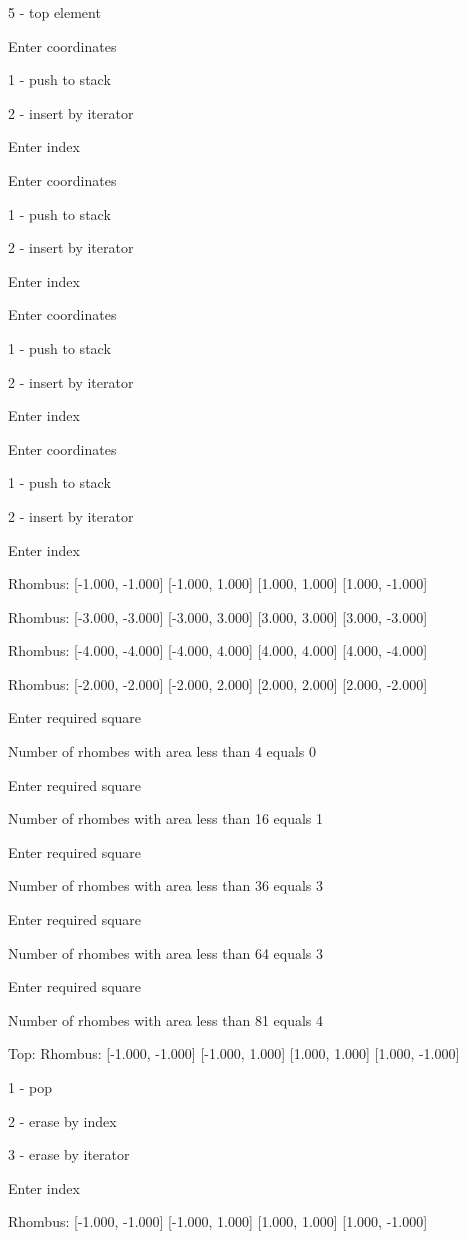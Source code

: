 \documentclass[a4paper, 12pt]{article}
\begin{document}
5 - top element

Enter coordinates

1 - push to stack

2 - insert by iterator

Enter index

Enter coordinates

1 - push to stack

2 - insert by iterator

Enter index

Enter coordinates

1 - push to stack

2 - insert by iterator

Enter index

Enter coordinates

1 - push to stack

2 - insert by iterator

Enter index

Rhombus: [-1.000, -1.000] [-1.000, 1.000] [1.000, 1.000] [1.000, -1.000] 

Rhombus: [-3.000, -3.000] [-3.000, 3.000] [3.000, 3.000] [3.000, -3.000] 

Rhombus: [-4.000, -4.000] [-4.000, 4.000] [4.000, 4.000] [4.000, -4.000] 

Rhombus: [-2.000, -2.000] [-2.000, 2.000] [2.000, 2.000] [2.000, -2.000] 

Enter required square

Number of rhombes with area less than 4 equals 0

Enter required square

Number of rhombes with area less than 16 equals 1

Enter required square

Number of rhombes with area less than 36 equals 3

Enter required square

Number of rhombes with area less than 64 equals 3

Enter required square

Number of rhombes with area less than 81 equals 4

Top: Rhombus: [-1.000, -1.000] [-1.000, 1.000] [1.000, 1.000] [1.000, -1.000] 

1 - pop

2 - erase by index

3 - erase by iterator

Enter index

Rhombus: [-1.000, -1.000] [-1.000, 1.000] [1.000, 1.000] [1.000, -1.000] 
\end{document}
